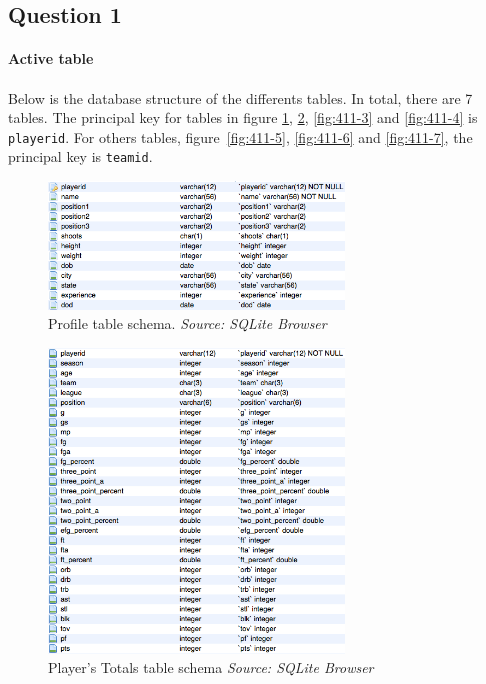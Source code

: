 
\subsection{Question 1}
\label{subsec:411}

\paragraph{Active table}





\paragraph{}Below is the database structure of the differents tables. In total, there are 7 tables. The principal key for tables in figure \ref{fig:411-1}, \ref{fig:411-2}, \ref{fig:411-3} and \ref{fig:411-4} is \texttt{playerid}. For others tables, figure~\ref{fig:411-5}, \ref{fig:411-6} and \ref{fig:411-7}, the principal key is \texttt{teamid}.

\begin{figure}[h!]
	\begin{center}
		\includegraphics[width=0.7\textwidth]{./images/profile}
		\caption{Profile table schema. \textit{Source: SQLite Browser}}
		\label{fig:411-1}
	\end{center}
\end{figure}

\begin{figure}[h!]
	\begin{center}
		\includegraphics[width=0.7\textwidth]{./images/player_total}
		\caption{Player's Totals table schema \textit{Source: SQLite Browser}}
		\label{fig:411-2}
	\end{center}
\end{figure}

